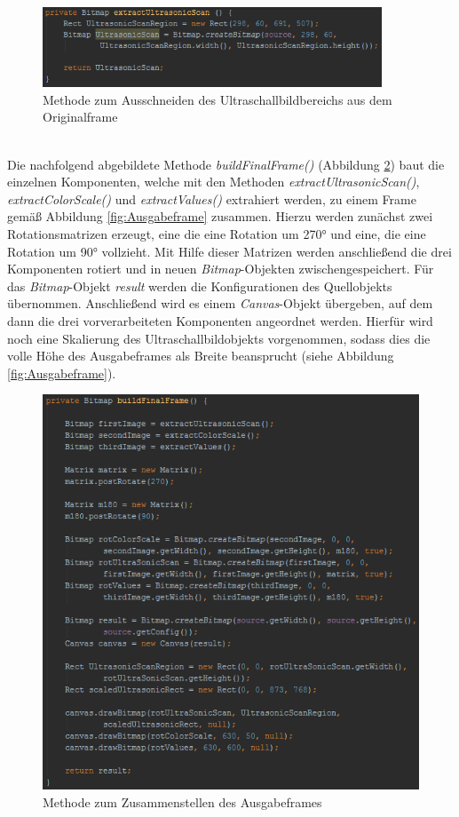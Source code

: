 \begin{figure}[h]
	\centering
	\includegraphics[width=0.9\textwidth]{Bilder/Bildverarbeitung/extractUltrasonicScan.PNG}
	\caption{Methode zum Ausschneiden des Ultraschallbildbereichs aus dem Originalframe}
	\label{fig:extractUltrasonicScan}
\end{figure}

~\\
Die nachfolgend abgebildete Methode \textit{buildFinalFrame()} (Abbildung \ref{fig:buildFinalFrame}) baut die einzelnen Komponenten, welche mit den Methoden \textit{extractUltrasonicScan()}, \textit{extractColorScale()} und \textit{extractValues()} extrahiert werden, zu einem Frame gemäß Abbildung \ref{fig:Ausgabeframe} zusammen. Hierzu werden zunächst zwei Rotationsmatrizen erzeugt, eine die eine Rotation um 270° und eine, die eine Rotation um 90° vollzieht. Mit Hilfe dieser Matrizen werden anschließend die drei Komponenten rotiert und in neuen \textit{Bitmap}-Objekten zwischengespeichert. Für das \textit{Bitmap}-Objekt \textit{result} werden die Konfigurationen des Quellobjekts übernommen. Anschließend wird es einem \textit{Canvas}-Objekt übergeben, auf dem dann die drei vorverarbeiteten Komponenten angeordnet werden. Hierfür wird noch eine Skalierung des Ultraschallbildobjekts vorgenommen, sodass dies die volle Höhe des Ausgabeframes als Breite beansprucht (siehe Abbildung \ref{fig:Ausgabeframe}).
\clearpage
\begin{figure}[h]
	\centering
	\includegraphics[width=1\textwidth]{Bilder/Bildverarbeitung/buildFinalFrame.PNG}
	\caption{Methode zum Zusammenstellen des Ausgabeframes}
	\label{fig:buildFinalFrame}
\end{figure}
